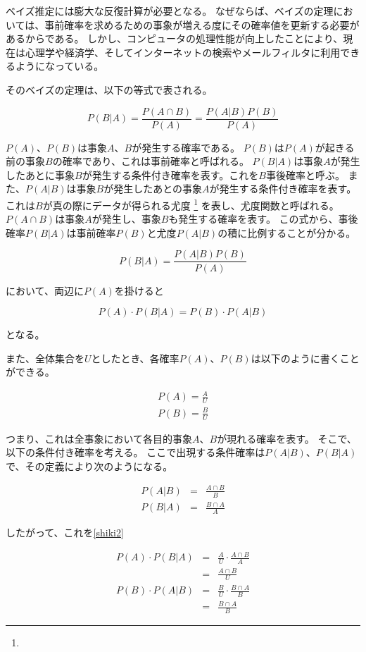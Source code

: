 \documentclass[11pt,a4j]{jsarticle}
\begin{document}
ベイズ推定には膨大な反復計算が必要となる。
なぜならば、ベイズの定理においては、事前確率を求めるための事象が増える度にその確率値を更新する必要があるからである。
しかし、コンピュータの処理性能が向上したことにより、現在は心理学や経済学、そしてインターネットの検索やメールフィルタに利用できるようになっている。

そのベイズの定理は、以下の等式で表される。

\[
P(B|A)=\frac{P(A \cap B)}{P(A)}=\frac{P(A|B)P(B)}{P(A)}
\]


$P(A)$、$P(B)$は事象$A$、$B$が発生する確率である。
$P(B)$は$P(A)$が起きる前の事象$B$の確率であり、これは事前確率と呼ばれる。
$P(B|A)$は事象$A$が発生したあとに事象$B$が発生する条件付き確率を表す。これを$B$事後確率と呼ぶ。
また、$P(A|B)$は事象$B$が発生したあとの事象$A$が発生する条件付き確率を表す。
これは$B$が真の際にデータが得られる尤度 \footnote{} を表し、尤度関数と呼ばれる。
$P(A \cap B)$は事象$A$が発生し、事象$B$も発生する確率を表す。
この式から、事後確率$P(B|A)$は事前確率$P(B)$と尤度$P(A|B)$の積に比例することが分かる。

\begin{equation}
P(B|A)=\frac{P(A|B)P(B)}{P(A)}
\end{equation}

において、両辺に$P(A)$を掛けると

\begin{equation}
  P(A) \cdot P(B|A)=P(B) \cdot P(A|B) \label{shiki2}
\end{equation}

となる。

また、全体集合を$U$としたとき、各確率$P(A)$、$P(B)$は以下のように書くことができる。

\begin{eqnarray*}
P(A) = \frac{A}{U}\\
P(B) = \frac{B}{U}
\end{eqnarray*}

つまり、これは全事象において各目的事象$A$、$B$が現れる確率を表す。
そこで、以下の条件付き確率を考える。
ここで出現する条件確率は$P(A|B)$、$P(B|A)$で、その定義により次のようになる。

\begin{eqnarray*}
P(A|B) & = & \frac{A \cap B}{B}\\
P(B|A) & = & \frac{B \cap A}{A}
\end{eqnarray*}

したがって、これを\ref{shiki2}

\begin{eqnarray*}
P(A) \cdot P(B|A) & = & \frac{A}{U} \cdot \frac{A \cap B}{A}\\
               & = & \frac{A \cap B}{U}\\
P(B) \cdot P(A|B)  & = &\frac{B}{U} \cdot \frac{B \cap A}{B}\\
                  & = & \frac{B \cap A}{B}
\end{eqnarray*}
\end{document}

